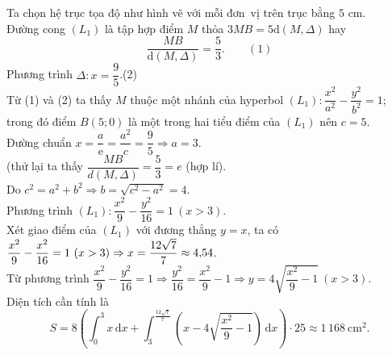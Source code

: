 \begin{bt}
{\begin{center}
		\end{center}
		Ta chọn hệ trục tọa độ như  hình vẽ với mỗi đơn~vị trên trục bằng $5$ cm.\\
		Đường cong $(L_1)$ là tập hợp điểm $M$ thỏa $3MB=5\mathrm{d}(M, \Delta)$ hay \[\dfrac{MB}{\mathrm{d}(M, \Delta)}=\dfrac{5}{3}.\qquad  (1)\]
		Phương trình $\Delta\colon  x=\dfrac{9}{5}$.\qquad (2)\\
		Từ (1) và (2) ta thấy $M$ thuộc một nhánh của hyperbol  $(L_1)\colon \dfrac{x^2}{a^2}-\dfrac{y^2}{b^2}=1$; trong đó điểm $B(5;0)$ là một trong hai tiểu điểm của $(L_1)$ nên $c=5$.\\
		Đường chuẩn $x=\dfrac{a}{\mathrm{e}}=\dfrac{a^2}{c}=\dfrac{9}{5} \Rightarrow a=3$.\\ (thử lại ta thấy  $\dfrac{MB}{d(M, \Delta)}=\dfrac{5}{3}=e$ (hợp lí).\\
		Do  $c^2=a^2+b^2\Rightarrow b=\sqrt{c^2-a^2}=4$.\\
		Phương trình  $(L_1)\colon \dfrac{x^2}{9}-\dfrac{y^2}{16}=1~(x > 3)$.\\
		 Xét giao điểm của $(L_1)$ với đương thẳng $y=x$, ta có $\dfrac{x^2}{9}-\dfrac{x^2}{16}=1~(x > 3)\\
		\Rightarrow x=\dfrac{12\sqrt{7}}{7}  \approx 4{,}54$.\\
		Từ phương trình $\dfrac{x^2}{9}-\dfrac{y^2}{16}=1\Rightarrow \dfrac{y^2}{16}=\dfrac{x^2}{9}-1\Rightarrow y=4\sqrt{\dfrac{x^2}{9}-1}~(x > 3)$.\\ 
		Diện tích cần tính là \[S=8\left(\displaystyle\int _0^3x\mathrm{\,d}x+\displaystyle\int_3^{\tfrac{12\sqrt{7}}{7}}\left(x-4\sqrt{\dfrac{x^2}{9}-1} \right)\mathrm{\,d}x \right)\cdot 25\approx 1\,168~ \mathrm{cm}^2.\] 
	 }
\end{bt}


